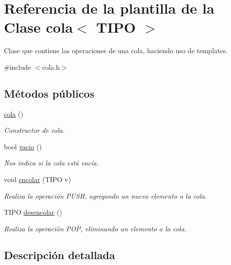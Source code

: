 \hypertarget{classcola}{}\section{Referencia de la plantilla de la Clase cola$<$ T\+I\+PO $>$}
\label{classcola}


Clase que contiene las operaciones de una cola, haciendo uso de templates.  




{\ttfamily \#include $<$cola.\+h$>$}

\subsection*{Métodos públicos}
\begin{DoxyCompactItemize}
\item 
\hyperlink{classcola_acf21bbf0b0795607993d5ffe736398ae}{cola} ()
\begin{DoxyCompactList}\small\item\em Constructor de cola. \end{DoxyCompactList}\item 
\mbox{\label{classcola_a2af9a71dd856a907f446a1e396d83e5b}} 
bool \hyperlink{classcola_a2af9a71dd856a907f446a1e396d83e5b}{vacio} ()
\begin{DoxyCompactList}\small\item\em Nos indica si la cola está vacía. \end{DoxyCompactList}\item 
void \hyperlink{classcola_a4fe29cbff3478979d38a0f8a2d7a4b51}{encolar} (T\+I\+PO v)
\begin{DoxyCompactList}\small\item\em Realiza la operación P\+U\+SH, agregando un nuevo elemento a la cola. \end{DoxyCompactList}\item 
\mbox{\label{classcola_afbe13fa4237aa2fde61067900ff8f884}} 
T\+I\+PO \hyperlink{classcola_afbe13fa4237aa2fde61067900ff8f884}{desencolar} ()
\begin{DoxyCompactList}\small\item\em Realiza la operación P\+OP, eliminando un elemento a la cola. \end{DoxyCompactList}\end{DoxyCompactItemize}


\subsection{Descripción detallada}
